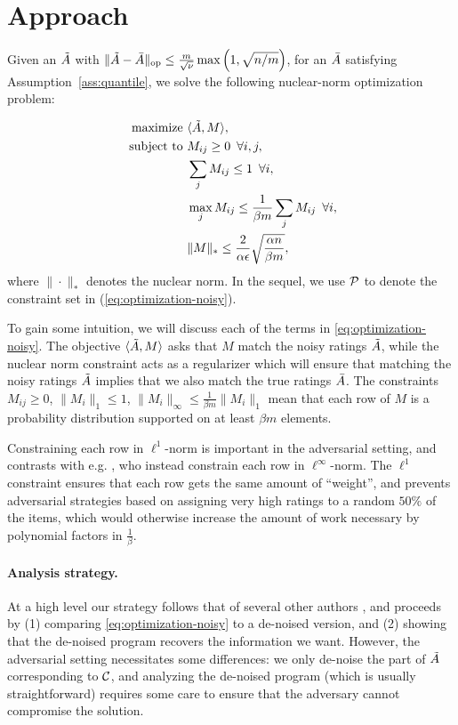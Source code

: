 \section{Approach}
\label{sec:approach}

Given an $\tilde{A}$ with $\|\tilde{A} - \bar{A}\|_{\mathrm{op}} \leq \frac{m}{\sqrt{\nu}}\max\left( 1, \sqrt{n/m} \right)$, for an 
$\bar{A}$ satisfying Assumption~\ref{ass:quantile}, we solve the following 
nuclear-norm optimization problem:

\begin{align}
\label{eq:optimization-noisy}
\text{maximize } &\langle \tilde{A}, M \rangle, \\
\notag \text{ subject to } &M_{ij} \geq 0 \,\,\, \forall i,j, \\
\notag  &\sum_j M_{ij} \leq 1 \,\,\, \forall i, \\
\notag  &\max_j M_{ij} \leq \frac{1}{\beta m}\sum_j M_{ij} \,\,\, \forall i, \\
\notag  &\|M\|_* \leq \frac{2}{\alpha\epsilon}\sqrt{\frac{\alpha n}{\beta m}},
\end{align}
where $\|\cdot\|_*$ denotes the nuclear norm. In the sequel, 
we use $\mathcal{P}$ to denote the constraint set in (\ref{eq:optimization-noisy}).

To gain some intuition, we will 
discuss each of the terms in \eqref{eq:optimization-noisy}. The objective 
$\langle \tilde{A}, M \rangle$ asks that $M$ match the noisy ratings 
$\tilde{A}$, while the nuclear norm constraint acts as a regularizer which will 
ensure that matching the noisy ratings $\tilde{A}$ implies that we also match the true 
ratings $\bar{A}$. The constraints $M_{ij} \geq 0$, $\|M_i\|_1 \leq 1$, 
$\|M_i\|_{\infty} \leq \frac{1}{\beta m} \|M_i\|_1$ mean that each row of 
$M$ is a probability distribution supported on at least $\beta m$ elements. 

Constraining each row in $\ell^1$-norm is important in the adversarial setting, 
and contrasts with e.g. \citet{todo}, who instead constrain each row in 
$\ell^{\infty}$-norm. The $\ell^1$ constraint ensures that each row gets the 
same amount of ``weight'', and prevents adversarial strategies based on assigning 
very high ratings to a random $50\%$ of the items, which would otherwise 
increase the amount of work necessary by polynomial factors in $\frac{1}{\beta}$.

\paragraph{Analysis strategy.}
At a high level our strategy follows that of several other authors 
\citep{todo}, and proceeds by (1) comparing \eqref{eq:optimization-noisy} to a 
de-noised version, and (2) showing that the de-noised program recovers the 
information we want. However, the adversarial setting necessitates some 
differences: we only de-noise the part of $\tilde{A}$ corresponding to $\mathcal{C}$, 
and analyzing the de-noised program (which is usually straightforward) requires 
some care to ensure that the adversary cannot compromise the solution.

